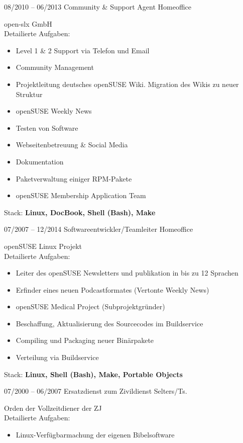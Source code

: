 \documentclass[a4paper]{friggeri-cv} %
\begin{document}
\begin{entrylist}
\entry
{08/2010 -- 06/2013}
{Community \& Support Agent}
{Homeoffice}
{open-slx GmbH \\
    Detailierte Aufgaben:
    \begin{itemize}
        \item Level 1 \& 2 Support via Telefon und Email
        \item Community Management
        \item Projektleitung deutsches openSUSE Wiki. Migration des Wikis zu neuer Struktur
        \item openSUSE Weekly News
        \item Testen von Software
        \item Webseitenbetreuung \& Social Media
        \item Dokumentation
        \item Paketverwaltung einiger RPM-Pakete
        \item openSUSE Membership Application Team
    \end{itemize}
		Stack: \textbf{Linux, DocBook, Shell (Bash), Make}
}
\entry
{07/2007 -- 12/2014}
{Softwareentwickler/Teamleiter}
{Homeoffice}
{openSUSE Linux Projekt\\
    Detailierte Aufgaben:
    \begin{itemize}
        \item Leiter des openSUSE Newsletters und publikation in bis zu 12 Sprachen
        \item Erfinder eines neuen Podcastformates (Vertonte Weekly News)
        \item openSUSE Medical Project (Subprojektgründer)
        \item Beschaffung, Aktualisierung des Sourcecodes im Buildservice
        \item Compiling und Packaging neuer Binärpakete
        \item Verteilung via Buildservice
    \end{itemize}
		Stack: \textbf{Linux, Shell (Bash), Make, Portable Objects}
}
\entry
{07/2000 -- 06/2007}
{Ersatzdienst zum Zivildienst}
{Selters/Ts.}
{Orden der Vollzeitdiener der ZJ\\
		 Detailierte Aufgaben:
    \begin{itemize}
        \item Linux-Verfügbarmachung der eigenen Bibelsoftware

\end{itemize}}
\end{entrylist}
\end{document}
